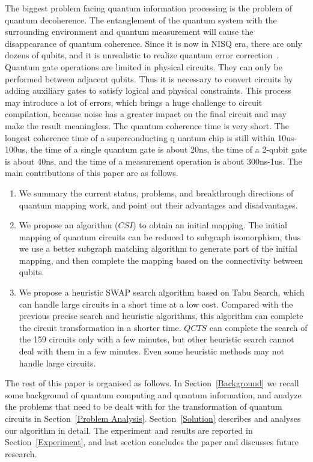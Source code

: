 \documentclass[runningheads]{llncs}
\begin{document}
The biggest problem facing quantum information processing is the problem of quantum decoherence.
The entanglement of the quantum system with the surrounding environment and quantum measurement 
will cause the disappearance of quantum coherence.
Since it is now in NISQ era, there are only dozens of qubits, 
and it is unrealistic to realize quantum error correction~\cite{2018QuantumPreskill}.
Quantum gate operations are limited in physical circuits. 
They can only be performed between adjacent qubits.
Thus it is necessary to convert circuits by adding auxiliary gates to satisfy logical and physical 
constraints. This process may introduce a lot of errors, 
which brings a huge challenge to circuit compilation, because noise has a greater impact on the 
final circuit and may make the result meaningless.
The quantum coherence time is very short. The longest coherence time of a superconducting q
uantum chip is still within 10us-100us, 
		the time of a single quantum gate is about 20ns, 
		the time of a 2-qubit gate is about 40ns, 
		and the time of a measurement operation is about 300ns-1us.
The main contributions of this paper are as follows.
	\begin{enumerate}
		\item We summary the current status, problems, and breakthrough directions 
		of quantum mapping work, and point out their advantages and disadvantages. 
		\item
		 We propose an algorithm ($CSI$) to obtain an initial mapping.
		 The initial mapping of quantum circuits can be reduced to subgraph isomorphism,
		 thus we use a better subgraph matching algorithm to generate part of the initial mapping, 
		 and then complete the mapping based on the connectivity between qubits.
		\item We propose a heuristic SWAP search algorithm based on Tabu Search, 
		which can handle large circuits in a short time at a low cost.
		Compared with the previous precise search and heuristic algorithms,
		this algorithm can complete the circuit transformation in a shorter time.
		$QCTS$ can complete the search of the 159 circuits only with a few minutes, 
		but other heuristic search cannot deal with them in a few minutes.
		Even some heuristic methods may not handle large circuits.
	\end{enumerate}
	The rest of this paper is organised as follows. 
	In Section~\ref{Background} we recall some background of quantum computing and quantum information,
	and analyze the problems that need to be dealt with for the transformation of quantum circuits in Section~\ref{Problem Analysis}.
	Section~\ref{Solution} describes and analyses our algorithm in detail. 
	The experiment and results are reported in Section~\ref{Experiment}, 
	and last section concludes the paper and discusses future research.
\end{document}
